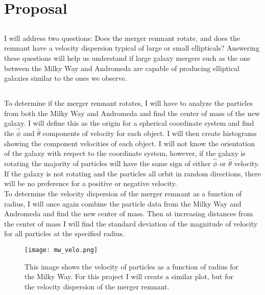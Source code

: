\documentclass[linenumbers]{aastex63}
\begin{document}
\section{Proposal}

\subsection{}
I will address two questions: Does the merger remnant rotate, and does the remnant have a velocity dispersion typical of large or small ellipticals? Answering these questions will help us understand if large galaxy mergers such as the one between the Milky Way and Andromeda are capable of producing elliptical galaxies similar to the ones we observe.

\subsection{}

To determine if the merger remnant rotates, I will have to analyze the particles from both the Milky Way and Andromeda and find the center of mass of the new galaxy. I will define this as the origin for a spherical coordinate system and find the $\hat{\phi}$ and $\hat{\theta}$ components of velocity for each object. I will then create histograms showing the component velocities of each object. I will not know the orientation of the galaxy with respect to the coordinate system, however, if the galaxy is rotating the majority of particles will have the same sign of either $\hat{\phi}$ or $\hat{\theta}$ velocity. If the galaxy is not rotating and the particles all orbit in random directions, there will be no preference for a positive or negative velocity.\\

To determine the velocity dispersion of the merger remnant as a function of radius, I will once again combine the particle data from the Milky Way and Andromeda and find the new center of mass. Then at increasing distances from the center of mass I will find the standard deviation of the magnitude of velocity for all particles at the specified radius.\\

\begin{figure}
    \centering
    \texttt{[image: mw\_velo.png]}
    \caption{This image shows the velocity of particles as a function of radius for the Milky Way. For this project I will create a similar plot, but for the velocity dispersion of the merger remnant.}
    \label{velocity}
\end{figure}
\end{document}

